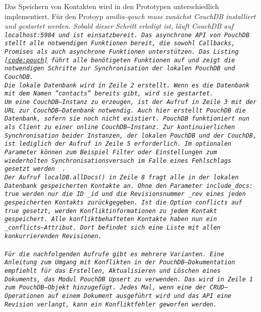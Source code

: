 Das Speichern von Kontakten wird in den Prototypen unterschiedlich implementiert.
%
%
Für den Protoyp \it{amilia-qouch} muss zunächst CouchDB installiert und gestartet werden.
Sobald dieser Schritt erledigt ist, läuft CouchDB auf \tt{localhost:5984} und ist einsatzbereit.
Das asynchrone \gls{API} von PouchDB stellt alle notwendigen Funktionen bereit, die sowohl Callbacks, Promises als auch asynchrone Funktionen unterstützen. 
Das Listing \ref{code:pouch} führt alle benötigeten Funktionen auf und zeigt die notwendigen Schritte zur Synchronisation der lokalen PouchDB und CouchDB.\\
Die lokale Datenbank wird in Zeile 2 erstellt. Wenn es die Datenbank mit dem Namen ''contacts'' bereits gibt, wird sie gestartet.\\
%
Um eine CouchDB--Instanz zu erzeugen, ist der Aufruf in Zeile 3 mit der URL zur CouchDB--Datenbank notwendig. Auch hier erstellt PouchDB die Datenbank, sofern sie noch nicht existiert. PouchDB funktioniert nun als Client zu einer online CouchDB--Instanz.
Zur kontinuierlichen Synchronisation beider Instanzen, der lokalen PouchDB und der CouchDB, ist lediglich der Aufruf in Zeile 5 erforderlich. Im optionalen Parameter können zum Beispiel Filter oder Einstellungen zum wiederholten Synchronisationsversuch im Falle eines Fehlschlags gesetzt werden ~\cite{pouch_options}.\\
Der Aufruf \tt{localDB.allDocs()} in Zeile 8 fragt alle in der lokalen Datenbank gespeicherten Kontakte an.
Ohne den Parameter \tt{include\_docs: true} werden nur die ID \tt{\_id} und die Revisionsnummer \tt{\_rev} eines jeden gespeicherten Kontakts zurückgegeben.
Ist die Option \tt{conflicts} auf \tt{true} gesetzt, werden Konfliktinformationen zu jedem Kontakt gespeichert.
Alle konfliktbehafteten Kontakte haben nun ein \tt{\_conflicts}--Attribut.
Dort befindet sich eine Liste mit allen konkurrierenden Revisionen.\\\\
%
Für die nachfolgenden Aufrufe gibt es mehrere Varianten.
Eine Anleitung zum Umgang mit Konflikten in der PouchDB--Dokumentation empfiehlt für das Erstellen, Aktualisieren und Löschen eines Dokuments, das Modul PouchDB Upsert zu verwenden.
Das wird in Zeile 1 zum PouchDB--Objekt hinzugefügt.
Jedes Mal, wenn eine der \gls{CRUD}--Operationen auf einem Dokument ausgeführt wird und das \gls{API} eine Revision verlangt, kann ein Konfliktfehler geworfen werden.
